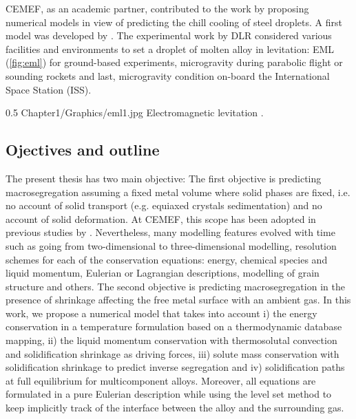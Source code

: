 CEMEF, as an academic partner, contributed to the work by proposing numerical models in view of predicting the chill cooling of steel droplets. 
A first model was developed by \citet{rivaux_simulation_2011}. 
The experimental work by DLR considered various facilities and environments to set a droplet of molten alloy in levitation: 
EML (\cref{fig:eml}) for ground-based experiments, 
microgravity during parabolic flight or sounding rockets and last, microgravity condition on-board the International Space Station (ISS).
\begin{figureth}
{0.5}
{Chapter1/Graphics/eml1.jpg}
{Electromagnetic levitation \citep{dlr_electomagnetic_2014}.}
\label{fig:eml}
\end{figureth}
%
\subsection{Ojectives and outline}
The present thesis has two main objective: 
The first objective is predicting macrosegregation assuming a fixed metal volume where solid phases are fixed, i.e. no account of solid 
transport (e.g. equiaxed crystals sedimentation) and no account of solid deformation. At CEMEF, this scope has been adopted in previous 
studies by \citet{gouttebroze_modelisation_2005, liu_finite_2005, mosbah_multiple_2008, rivaux_simulation_2011, carozzani_developpement_2012}.
Nevertheless, many modelling features evolved with time such as going from two-dimensional to three-dimensional modelling, resolution schemes
for each of the conservation equations: energy, chemical species and liquid momentum, Eulerian or Lagrangian descriptions, 
modelling of grain structure and others. 
The second objective is predicting macrosegregation in the presence of shrinkage affecting the free metal surface with an ambient gas.
In this work, we propose a numerical model that takes into account 
i) the energy conservation in a temperature formulation based on a thermodynamic database mapping,
ii) the liquid momentum conservation with thermosolutal convection and solidification shrinkage as driving forces, 
iii) solute mass conservation with solidification shrinkage to predict inverse segregation and 
iv) solidification paths at full equilibrium for multicomponent alloys. 
Moreover, all equations are formulated in a pure Eulerian description while using the level set method to keep 
implicitly track of the interface between the alloy and the surrounding gas. 

